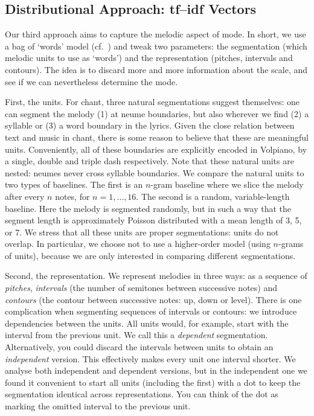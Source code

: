 \documentclass{article}
\begin{document}
\subsection{Distributional Approach: tf--idf Vectors}\label{sec:tfidf}

Our third approach aims to capture the melodic aspect of mode.
In short, we use a bag of `words' model (cf.~\cite{Gulati2016a}) and tweak two parameters: the segmentation (which melodic units to use as `words') and the representation (pitches, intervals and contours).
The idea is to discard more and more information about the scale, and see if we can nevertheless determine the mode.


First, the units.
For chant, three natural segmentations suggest themselves: one can segment the melody (1) at neume boundaries, but also wherever we find (2) a syllable or (3) a word boundary in the lyrics.
Given the close relation between text and music in chant, there is some reason to believe that these are meaningful units.
Conveniently, all of these boundaries are explicitly encoded in Volpiano, by a single, double and triple dash respectively.
Note that these natural units are nested: neumes never cross syllable boundaries.
We compare the natural units to two types of baselines.
The first is an $n$-gram baseline where we slice the melody after every $n$ notes, for $n=1, \dots, 16$.
The second is a random, variable-length baseline.
Here the melody is segmented randomly, but in such a way that the segment length is approximately Poisson distributed with a mean length of 3, 5, or 7.
We stress that all these units are proper segmentations: units do not overlap. 
In particular, we choose not to use a higher-order model (using $n$-grams of units), because we are only interested in comparing different segmentations.


Second, the representation.
We represent melodies in three ways: as a sequence of \emph{pitches}, \emph{intervals} (the number of semitones between successive notes) and \emph{contours} (the contour between successive notes: up, down or level).
There is one complication when segmenting sequences of intervals or contours: we introduce dependencies between the units.
All units would, for example, start with the interval from the previous unit. 
We call this a \emph{dependent} segmentation.
Alternatively, you could discard the intervals between units to obtain an \emph{independent} version.
This effectively makes every unit one interval shorter.
We analyse both independent and dependent versions, but in the independent one we found it convenient to start all units (including the first) with a dot to keep the segmentation identical across representations.
You can think of the dot as marking the omitted interval to the previous unit.
\end{document}
